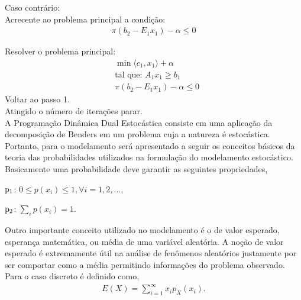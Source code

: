 	Caso contr\'ario:\\

	Acrecente ao problema principal a condi\c c\~ao:
		\begin{align*}
			\pi(b_2 - E_1x_1) - \alpha \leq 0
		\end{align*}

	Resolver o problema principal:
		\begin{align*}
			&\min \langle c_1,x_1\rangle + \alpha \nonumber\\
			&\mbox{tal que: }	A_1 x_1 \geq b_1\\
			&\pi(b_2 - E_1x_1) - \alpha \leq 0
		\end{align*}
Voltar ao passo 1.\\
Atingido o número de itera\c c\~oes parar.\\
A Programa\c c\~ao Din\^amica Dual Estoc\'astica consiste em uma aplica\c c\~ao da decomposi\c c\~ao de Benders em um problema cuja a
natureza \'e
estoc\'astica. Portanto, para o modelamento ser\'a apresentado a seguir os conceitos b\'asicos da teoria das
probabilidades 
utilizados na formula\c c\~ao do modelamento estoc\'astico.
Basicamente uma probabilidade deve garantir as seguintes propriedades,
	\begin{description}
		\centering
		\item $\rm{p_1}$: $ 0 \leq p(x_i) \leq 1, \forall i = 1,2, \dots $, 
		\item $\rm{p_2}$: $ \sum\limits_{i}^{} p(x_i)= 1. \qquad \qquad \quad \ \ \ \ $ 
  	\end{description} 

	Outro importante conceito utilizado no modelamento \'e o de valor esperado, esperan\c{c}a matem\'{a}tica, ou m\'{e}dia de
uma vari\'{a}vel aleat\'oria. A no\c c\~ao de valor esperado \'e extremamente \'{u}til na an\'{a}lise de fen\^{o}menos
aleat\'{o}rios justamente por
ser comportar como a m\'{e}dia permitindo informa\c{c}\~{o}es do problema observado.
Para o caso discreto \'e definido como, 
	\begin{align}
		\label{dise}
		E(X) = \sum\limits_{i = 1}^{\infty}x_ip_X(x_i).
	\end{align}

